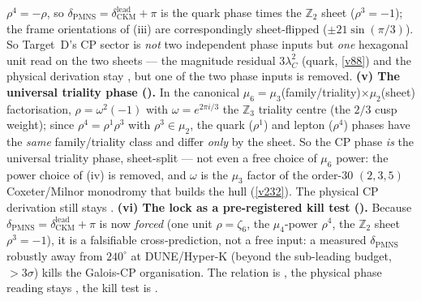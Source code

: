 \documentclass[11pt,a4paper]{article}
\providecommand{\Z}{\mathbb{Z}}
\begin{document}
\begin{winbox}
$\rho^4=-\rho$, so $\delta_{\mathrm{PMNS}}=\delta_{\mathrm{CKM}}^{\mathrm{lead}}+\pi$ is the quark phase times
the $\Z_2$ sheet ($\rho^3=-1$); the frame orientations of (iii) are correspondingly sheet-flipped
($\pm21\sin(\pi/3)$). So Target~D's CP sector is \emph{not} two independent phase inputs but \emph{one}
hexagonal unit read on the two sheets --- the magnitude residual $3\lambda_C^2$ (quark, \vref{v88}) and the
physical derivation stay \mC, but one of the two phase inputs is removed. \textbf{(v) The universal triality
phase ().} In the canonical $\mu_6=\mu_3$(family/triality)$\times\mu_2$(sheet)
factorisation, $\rho=\omega^2(-1)$ with $\omega=e^{2\pi i/3}$ the $\Z_3$ triality centre (the $2/3$ cusp
weight); since $\rho^4=\rho^1\rho^3$ with $\rho^3\in\mu_2$, the quark ($\rho^1$) and lepton ($\rho^4$) phases
have the \emph{same} family/triality class and differ \emph{only} by the sheet. So the CP phase \emph{is} the
universal triality phase, sheet-split --- not even a free choice of $\mu_6$ power: the power choice of (iv)
is removed, and $\omega$ is the $\mu_3$ factor of the order-$30$ $(2,3,5)$ Coxeter/Milnor monodromy that
builds the hull (\vref{v232}). The physical CP derivation still stays \mC.
\textbf{(vi) The lock as a pre-registered kill test ().} Because
$\delta_{\mathrm{PMNS}}=\delta_{\mathrm{CKM}}^{\mathrm{lead}}+\pi$ is now \emph{forced} (one unit $\rho=\zeta_6$,
the $\mu_4$-power $\rho^4$, the $\Z_2$ sheet $\rho^3{=}-1$), it is a falsifiable cross-prediction, not a free
input: a measured $\delta_{\mathrm{PMNS}}$ robustly away from $240^\circ$ at DUNE/Hyper-K (beyond the sub-leading
budget, $>3\sigma$) kills the Galois-CP organisation. The relation is \mE, the physical phase reading stays \mC,
the kill test is \mX.
\end{winbox}
\end{document}
